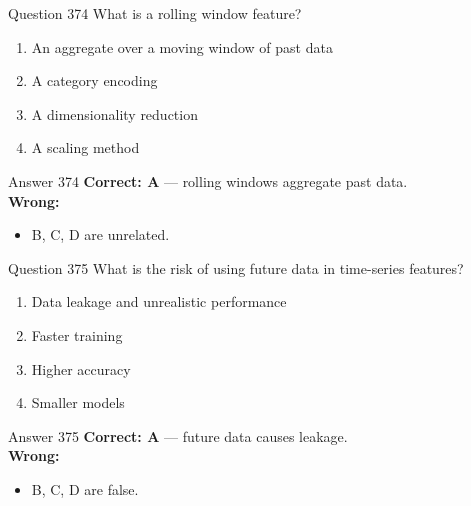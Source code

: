 \documentclass[aspectratio=169,11pt]{beamer}
\begin{document}
	\begin{frame}{Question 374}
		What is a rolling window feature?
		\begin{enumerate}[label=\Alph*.]
			\item An aggregate over a moving window of past data
			\item A category encoding
			\item A dimensionality reduction
			\item A scaling method
		\end{enumerate}
	\end{frame}
	\begin{frame}{Answer 374}
		\textbf{Correct: A} --- rolling windows aggregate past data.\\
		\vspace{0.5em}
		\textbf{Wrong:}
		\begin{itemize}
			\item B, C, D are unrelated.
		\end{itemize}
	\end{frame}
	
	\begin{frame}{Question 375}
		What is the risk of using future data in time-series features?
		\begin{enumerate}[label=\Alph*.]
			\item Data leakage and unrealistic performance
			\item Faster training
			\item Higher accuracy
			\item Smaller models
		\end{enumerate}
	\end{frame}
	\begin{frame}{Answer 375}
		\textbf{Correct: A} --- future data causes leakage.\\
		\vspace{0.5em}
		\textbf{Wrong:}
		\begin{itemize}
			\item B, C, D are false.
		\end{itemize}
	\end{frame}
	
\end{document}
